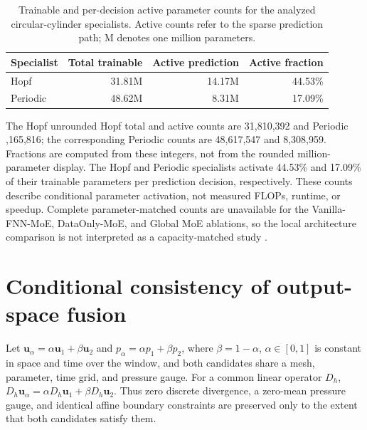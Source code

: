 \documentclass{article}
\providecommand{\DIFaddtex}[1]{{\protect\color{blue} \sf #1}} %
\providecommand{\DIFdeltex}[1]{{\protect\color{red} \scriptsize #1}} %
\providecommand{\DIFaddbegin}{} %
\providecommand{\DIFaddend}{} %
\providecommand{\DIFdelbegin}{} %
\providecommand{\DIFdelend}{} %
\providecommand{\DIFadd}[1]{\texorpdfstring{\DIFaddtex{#1}}{#1}} %
\providecommand{\DIFdel}[1]{\texorpdfstring{\DIFdeltex{#1}}{}} %
\providecommand{\DIFscaledelfig}{0.5}
\newlength{\DIFdelgraphicswidth} %
\newlength{\DIFdelgraphicsheight} %
\providecommand{\DIFaddincludegraphics}[2][]{{\color{blue}\fbox{\DIFOincludegraphics[#1]{#2}}}} %
\providecommand{\DIFdelincludegraphics}[2][]{%
\sbox{\DIFdelgraphicsbox}{\DIFOincludegraphics[#1]{#2}}%
\settoboxwidth{\DIFdelgraphicswidth}{\DIFdelgraphicsbox} %
\settoboxtotalheight{\DIFdelgraphicsheight}{\DIFdelgraphicsbox} %
\scalebox{\DIFscaledelfig}{%
\parbox[b]{\DIFdelgraphicswidth}{\usebox{\DIFdelgraphicsbox}\\[-\baselineskip] \rule{\DIFdelgraphicswidth}{0em}}\llap{\resizebox{\DIFdelgraphicswidth}{\DIFdelgraphicsheight}{%
\setlength{\unitlength}{\DIFdelgraphicswidth}%
\begin{picture}(1,1)%
\thicklines\linethickness{2pt} %
{\color[rgb]{1,0,0}\put(0,0){\framebox(1,1){}}}%
{\color[rgb]{1,0,0}\put(0,0){\line( 1,1){1}}}%
{\color[rgb]{1,0,0}\put(0,1){\line(1,-1){1}}}%
\end{picture}%
}\hspace*{3pt}}} %
} %
\DeclareRobustCommand{\DIFaddbegin}{\DIFOaddbegin \let\includegraphics\DIFaddincludegraphics} %
\DeclareRobustCommand{\DIFaddend}{\DIFOaddend \let\includegraphics\DIFOincludegraphics} %
\DeclareRobustCommand{\DIFdelbegin}{\DIFOdelbegin \let\includegraphics\DIFdelincludegraphics} %
\DeclareRobustCommand{\DIFdelend}{\DIFOaddend \let\includegraphics\DIFOincludegraphics} %
\begin{document}
\par
\begin{table}[H]
\centering
\caption{Trainable and per-decision active parameter counts for the analyzed
circular-cylinder specialists. Active counts refer to the sparse prediction
path; M denotes one million parameters.}
\label{tab:parameter_counts}
\begin{tabular}{lrrr}
\toprule
Specialist & Total trainable & Active prediction & Active fraction \\
\midrule
Hopf & 31.81M & 14.17M & 44.53\% \\
Periodic & 48.62M & 8.31M & 17.09\% \\
\bottomrule
\end{tabular}
\end{table}
\par

The \DIFdelbegin \DIFdel{Hopf }\DIFdelend \DIFaddbegin \DIFadd{unrounded Hopf total and active counts are 31,810,392 }\DIFaddend and \DIFdelbegin \DIFdel{Periodic }\DIFdelend \DIFaddbegin \DIFadd{14,165,816; the corresponding Periodic counts are 48,617,547 and 8,308,959. Fractions are computed from these integers, not from the rounded million-parameter display.
The Hopf and Periodic }\DIFaddend specialists activate 44.53\% and 17.09\% of their
trainable parameters per prediction decision, respectively. These counts
describe conditional parameter activation, not measured FLOPs, runtime,
or speedup. Complete parameter-matched counts are unavailable for the
Vanilla-FNN-MoE, DataOnly-MoE, and Global MoE ablations, so the local
architecture comparison is not interpreted as a capacity-matched study\DIFaddbegin \DIFadd{.
}

\clearpage
\section{\DIFadd{Conditional consistency of output-space fusion}}
\label{app:fusion_consistency}
\DIFadd{Let $\bm u_\alpha=\alpha\bm u_1+\beta\bm u_2$ and $p_\alpha=\alpha p_1+\beta p_2$, where $\beta=1-\alpha$, $\alpha\in[0,1]$ is constant in space and time over the window, and both candidates share a mesh, parameter, time grid, and pressure gauge. For a common linear operator $D_h$, $D_h\bm u_\alpha=\alpha D_h\bm u_1+\beta D_h\bm u_2$. Thus zero discrete divergence, a zero-mean pressure gauge, and identical affine boundary constraints are preserved only to the extent that both candidates satisfy them.
}
\end{document}

